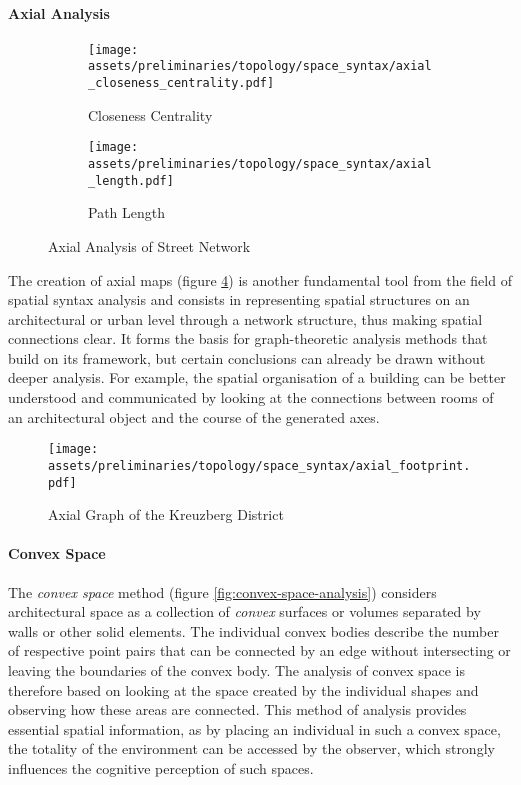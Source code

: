 \documentclass[a4paper, 12pt]{report}
\begin{document}
\paragraph{Axial Analysis}\label{par:axial-analysis}

\begin{figure}
\centering
\begin{subfigure}{.5\textwidth}
\centering
\texttt{[image: assets/preliminaries/topology/space\_syntax/axial\_closeness\_centrality.pdf]}
\caption{Closeness Centrality}
\label{fig:closeness-centrality-1}
\end{subfigure}%
\begin{subfigure}{.5\textwidth}
\centering
\texttt{[image: assets/preliminaries/topology/space\_syntax/axial\_length.pdf]}
\caption{Path Length}
\label{fig:path-length}
\end{subfigure}
\caption{Axial Analysis of Street Network}
\label{fig:axial-analysis-of-street-network}
\end{figure}

The creation of \glspl{axial map} (figure \ref{fig:axial-graph-of-kreuzberg-district}) is another fundamental tool from the field of spatial syntax analysis and consists in representing spatial structures on an architectural or urban level through a network structure, thus making spatial connections clear. It forms the basis for graph-theoretic analysis methods that build on its framework, but certain conclusions can already be drawn without deeper analysis. For example, the spatial organisation of a building can be better understood and communicated by looking at the connections between rooms of an architectural object and the course of the generated axes.

\begin{figure}
\centering
\texttt{[image: assets/preliminaries/topology/space\_syntax/axial\_footprint.pdf]}
\caption{Axial Graph of the Kreuzberg District}
\label{fig:axial-graph-of-kreuzberg-district}
\end{figure}

\paragraph{Convex Space}\label{par:convex-space}

The \textit{convex space} method (figure \ref{fig:convex-space-analysis}) considers architectural space as a collection of \textit{\gls{convex}} surfaces or volumes separated by walls or other solid elements. The individual \gls{convex} bodies describe the number of respective point pairs that can be connected by an edge without intersecting or leaving the boundaries of the \gls{convex} body. The analysis of convex space is therefore based on looking at the space created by the individual shapes and observing how these areas are connected. This method of analysis provides essential spatial information, as by placing an individual in such a convex space, the totality of the environment can be accessed by the observer, which strongly influences the cognitive perception of such spaces.
\end{document}
